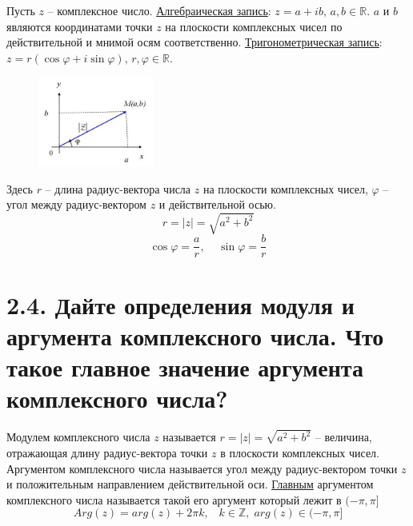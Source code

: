 \documentclass{article}
\begin{document}
Пусть $z$ -- комплексное число.
\newline \underline{Алгебраическая запись}: $z = a + ib,\, a,b \in \mathbb{R}$.
\newline $a$ и $b$ являются координатами точки $z$ на плоскости комплексных чисел по действительной и мнимой осям соответственно.
\newline \underline{Тригонометрическая запись}: $z = r(\cos{\varphi} + i\sin{\varphi}),\, r, \varphi \in \mathbb{R}$.
\newline 
\begin{figure}
    \centering
    \includegraphics[width=0.34\textwidth]{images/complex.jpg}
\end{figure} Здесь $r$ -- длина радиус-вектора числа $z$ на плоскости комплексных чисел, $\varphi$ -- угол между радиус-вектором $z$ и действительной осью.
$$r = |z| = \sqrt{a^2 + b^2}$$
$$\cos{\varphi} = \frac{a}{r}, \;\;\;\; \sin{\varphi} = \frac{b}{r}$$

\section*{\LARGE 2.4. Дайте определения модуля и аргумента комплексного числа. Что такое главное значение аргумента комплексного числа? }

Модулем комплексного числа $z$ называется $r = |z| = \sqrt{a^2 + b^2}$ -- величина, отражающая длину радиус-вектора точки $z$ в плоскости комплексных чисел.
\newline Аргументом комплексного числа называется угол между радиус-вектором точки $z$ и положительным направлением действительной оси. \underline{Главным} аргументом комплексного числа называется такой его аргумент который лежит в $(-\pi, \pi]$
$$ Arg(z) = arg(z) + 2\pi k,\;\;\; k \in \mathbb{Z},\; arg(z) \in (-\pi, \pi]$$

\end{document}
